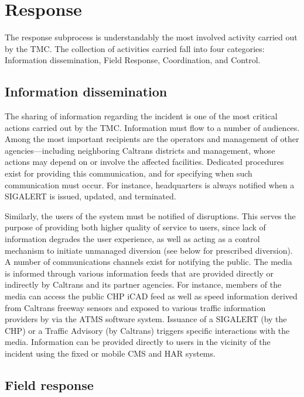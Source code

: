 \documentclass[12pt]{report}
\begin{document}
\section{Response}
\label{sec:response}

The response subprocess is understandably the most involved activity carried out
by the \ac{TMC}.  The collection of activities carried fall into four
categories: Information dissemination, Field Response, Coordination, and
Control.

\subsection{Information dissemination}
\label{sec:inf-dis}

The sharing of information regarding the incident is one of the most critical
actions carried out by the \ac{TMC}.  Information must flow to a number of
audiences.  Among the most important recipients are the operators and management
of other agencies---including neighboring Caltrans districts and management,
whose actions may depend on or involve the affected facilities.  Dedicated
procedures exist for providing this communication, and for specifying when such
communication must occur.  For instance, headquarters is always notified when a
SIGALERT is issued, updated, and terminated.

Similarly, the users of the system must be notified of disruptions.  This serves
the purpose of providing both higher quality of service to users, since lack of
information degrades the user experience, as well as acting as a control
mechanism to initiate unmanaged diversion (see below for prescribed diversion).
A number of communications channels exist for notifying the public.  The media
is informed through various information feeds that are provided directly or
indirectly by Caltrans and its partner agencies.  For instance, members of the
media can access the public \ac{CHP} \ac{iCAD} feed as well as speed information
derived from Caltrans freeway sensors and exposed to various traffic information
providers by via the \ac{ATMS} software system.  Issuance of a SIGALERT (by the
\ac{CHP}) or a Traffic Advisory (by Caltrans) triggers specific interactions
with the media.  Information can be provided directly to users in the vicinity
of the incident using the fixed or mobile \acf{CMS} and \ac{HAR} systems.

\subsection{Field response}
\label{sec:field-response}
\end{document}
